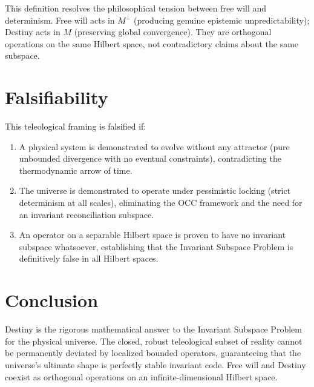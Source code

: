 \documentclass[12pt, a4paper]{article}
\theoremstyle{plain}
\theoremstyle{definition}
\begin{document}
\begin{remark}
This definition resolves the philosophical tension between free will and determinism. Free will acts in $M^\perp$ (producing genuine epistemic unpredictability); Destiny acts in $M$ (preserving global convergence). They are orthogonal operations on the same Hilbert space, not contradictory claims about the same subspace.
\end{remark}

\section{Falsifiability}\label{sec:falsifiability}

\begin{proposition}
This teleological framing is falsified if:
\begin{enumerate}
    \item A physical system is demonstrated to evolve without any attractor (pure unbounded divergence with no eventual constraints), contradicting the thermodynamic arrow of time.
    \item The universe is demonstrated to operate under pessimistic locking (strict determinism at all scales), eliminating the OCC framework and the need for an invariant reconciliation subspace.
    \item An operator on a separable Hilbert space is proven to have no invariant subspace whatsoever, establishing that the Invariant Subspace Problem is definitively false in all Hilbert spaces.
\end{enumerate}
\end{proposition}

\section{Conclusion}

Destiny is the rigorous mathematical answer to the Invariant Subspace Problem for the physical universe. The closed, robust teleological subset of reality cannot be permanently deviated by localized bounded operators, guaranteeing that the universe's ultimate shape is perfectly stable invariant code. Free will and Destiny coexist as orthogonal operations on an infinite-dimensional Hilbert space.

\vspace{2em}
\noindent\hrulefill
\vspace{1em}
\end{document}
